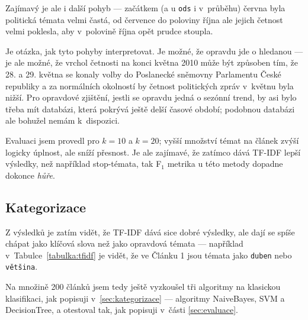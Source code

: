 \documentclass[12pt,a4paper]{report}
\begin{document}
Zajímavý je ale i další pohyb --- začátkem (a u \texttt{ods} i v~průběhu) června byla politická témata velmi častá, od července do poloviny října ale jejich četnost velmi poklesla, aby v~polovině října opět prudce stoupla.

Je otázka, jak tyto pohyby interpretovat. Je možné, že opravdu jde o hledanou  --- je ale možné, že vrchol četnosti na konci května 2010 může být způsoben tím, že 28. a 29. května se konaly volby do Poslanecké sněmovny Parlamentu České republiky a za normálních okolností by četnost politických zpráv v~květnu byla nižší. Pro opravdové zjištění, jestli se opravdu jedná o sezónní trend, by asi bylo třeba mít databázi, která pokrývá ještě delší časové období; podobnou databázi ale bohužel nemám k~dispozici.



Evaluaci jsem provedl pro $k=10$ a $k=20$; vyšší množství témat na článek zvýší logicky úplnost, ale sníží přesnost. Je ale zajímavé, že zatímco  dává TF-IDF lepší výsledky, než například stop-témata, tak F$_1$ metrika u této metody dopadne dokonce \emph{hůře}.

\subsection{Kategorizace}
Z výsledků je zatím vidět, že TF-IDF dává sice dobré výsledky, ale dají se spíše chápat jako klíčová slova než jako opravdová témata --- například v~Tabulce~\ref{tabulka:tfidf} je vidět, že ve Článku 1 jsou témata jako \texttt{duben} nebo \texttt{většina}.


Na množině 200 článků jsem tedy ještě vyzkoušel tři algoritmy na klasickou klasifikaci, jak popisuji v~\ref{sec:kategorizace} --- algoritmy NaiveBayes, SVM a DecisionTree, a otestoval tak, jak popisuji v~části \ref{sec:evaluace}. 
\end{document}
